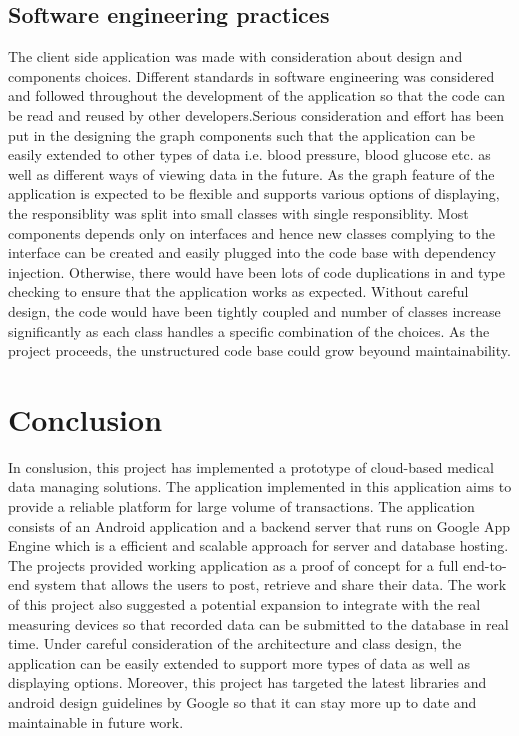 \subsection{Software engineering practices}
The client side application was made with consideration about design and components choices. Different standards in
software engineering was considered and followed throughout the development of the application so that the code can be
read and reused by other developers.Serious consideration and effort has been put in the designing the graph components
such that the application can be easily extended to other types of data i.e. blood pressure, blood glucose etc. as well
as different ways of viewing data in the future. As the graph feature of the application is expected to be flexible and
supports various options of displaying, the responsiblity was split into small classes with single responsiblity.
Most components depends only on interfaces and hence new classes complying to the interface can be created and easily
plugged into the code base with dependency injection. Otherwise, there would have been lots of code duplications in and
type checking to ensure that the application works as expected. Without careful design, the code would have been tightly
coupled and number of classes increase significantly as each class handles a specific combination of the choices. As the
project proceeds, the unstructured code base could grow beyound maintainability.

\section{Conclusion}
In conslusion, this project has implemented a prototype of cloud-based medical data managing solutions. The application
implemented in this application aims to provide a reliable platform for large volume of transactions. The application
consists of an Android application and a backend server that runs on Google App Engine which is a efficient and scalable
approach for server and database hosting. The projects provided working application as a proof of concept for a full
end-to-end system that allows the users to post, retrieve and share their data. The work of this project also suggested
a potential expansion to integrate with the real measuring devices so that recorded data can be submitted to the
database in real time. Under careful consideration of the architecture and class design, the application can be easily
extended to support more types of data as well as displaying options. Moreover, this project has targeted the latest
libraries and android design guidelines by Google so that it can stay more up to date and maintainable in future work.
\vfill

 


